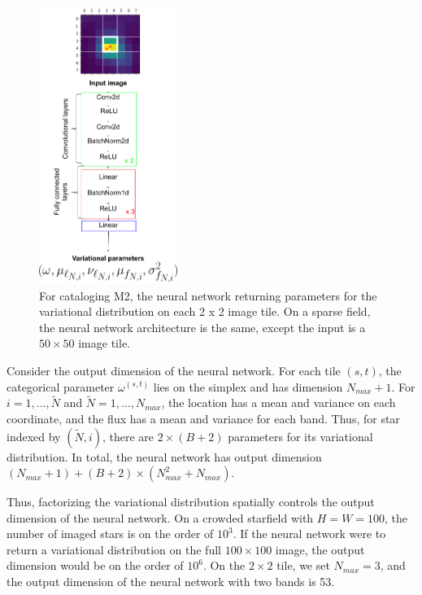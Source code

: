 \begin{figure}[!ht]
    \centering
    \includegraphics[width=0.4\textwidth]{figures/starnet_archetecture2.png}
    \vspace{-0.5cm}
    \caption{For cataloging M2, the neural network returning parameters for the variational distribution on each 2 x 2 image tile.
    On a sparse field, the neural network architecture is the same, 
    except the input is a $50 \times 50$ image tile. }
    \label{fig:starnet_arch}
\end{figure}

Consider the output dimension of the neural network. For each tile $(s,t)$, the categorical parameter $\omega^{(s,t)}$
lies on the simplex and has dimension $N_{max} + 1$. 
For $i = 1, ..., \tilde N$ and $\tilde N = 1, ..., N_{max}$, the location has a mean and variance on each coordinate, and the flux has a mean and variance for each band. Thus, for star indexed by $(\tilde N, i)$, 
there are $2 \times (B + 2)$ parameters for its variational distribution. In total, the neural network has output dimension $(N_{max} + 1) + (B + 2) \times (N_{max}^2 + N_{max})$. 


Thus, factorizing the variational distribution spatially controls the output dimension of the neural network. On a crowded starfield with $H = W = 100$, the number of imaged stars is on the order of $10^3$. If the neural network were to return a variational distribution on the full $100\times 100$ image, the output dimension would be on the order of $10^6$. 
On the $2\times 2$ tile, we set $N_{max} = 3$, and the output dimension of the neural network with two bands is 53. 


